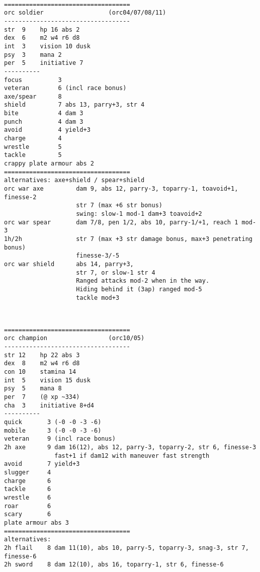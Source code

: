 \

\pagebreak[1]
\tiny \begin{samepage} \begin{verbatim}
===================================
orc soldier                  (orc04/07/08/11)
-----------------------------------
str  9    hp 16 abs 2
dex  6    m2 w4 r6 d8
int  3    vision 10 dusk
psy  3    mana 2
per  5    initiative 7
----------
focus          3
veteran        6 (incl race bonus)
axe/spear      8
shield         7 abs 13, parry+3, str 4
bite           4 dam 3
punch          4 dam 3
avoid          4 yield+3
charge         4
wrestle        5
tackle         5
crappy plate armour abs 2
===================================
alternatives: axe+shield / spear+shield
orc war axe         dam 9, abs 12, parry-3, toparry-1, toavoid+1, finesse-2
                    str 7 (max +6 str bonus)
                    swing: slow-1 mod-1 dam+3 toavoid+2
orc war spear       dam 7/8, pen 1/2, abs 10, parry-1/+1, reach 1 mod-3
1h/2h               str 7 (max +3 str damage bonus, max+3 penetrating bonus)
                    finesse-3/-5
orc war shield      abs 14, parry+3,
                    str 7, or slow-1 str 4
                    Ranged attacks mod-2 when in the way.
                    Hiding behind it (3ap) ranged mod-5
                    tackle mod+3
\end{verbatim} \end{samepage} \normalsize

\

\pagebreak[1]
\tiny \begin{samepage} \begin{verbatim}
===================================
orc champion                 (orc10/05)
-----------------------------------
str 12    hp 22 abs 3
dex  8    m2 w4 r6 d8
con 10    stamina 14
int  5    vision 15 dusk
psy  5    mana 8
per  7    (@ xp ~334)
cha  3    initiative 8+d4
----------
quick       3 (-0 -0 -3 -6)
mobile      3 (-0 -0 -3 -6)
veteran     9 (incl race bonus)
2h axe      9 dam 16(12), abs 12, parry-3, toparry-2, str 6, finesse-3
              fast+1 if dam12 with maneuver fast strength
avoid       7 yield+3
slugger     4
charge      6
tackle      6
wrestle     6
roar        6
scary       6
plate armour abs 3
===================================
alternatives:
2h flail    8 dam 11(10), abs 10, parry-5, toparry-3, snag-3, str 7, finesse-6
2h sword    8 dam 12(10), abs 16, toparry-1, str 6, finesse-6
\end{verbatim} \end{samepage} \normalsize

